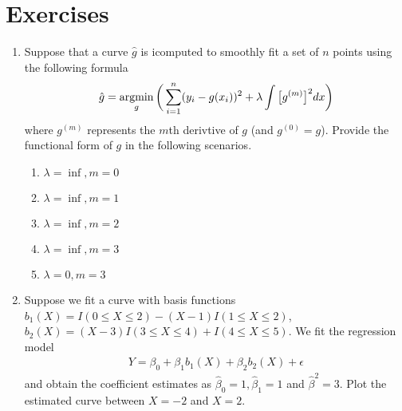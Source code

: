 \documentclass[../statistical_learning_notes.tex]{subfiles}
\begin{document}
    \section{Exercises}
    \begin{enumerate}
        \item Suppose that a curve $\hat{g}$ is icomputed to smoothly fit a set of $n$ points using the following formula
        \begin{align*}
            \hat{g} = \operatorname*{argmin}_{g} \bigg( \sum_{i=1}^{n} (y_{i} - g(x_{i}))^{2} + \lambda \int \big[ g^{(m)} \big]^{2} dx \bigg)
        \end{align*}
        where $g^{(m)}$ represents the $m$th derivtive of $g$ (and $g^{(0)}= g$). Provide the functional form of $g$ in the following scenarios.
        \begin{enumerate}
            \item $\lambda = \inf, m = 0$
            \item $\lambda = \inf, m = 1$
            \item $\lambda = \inf, m = 2$
            \item $\lambda = \inf, m = 3$
            \item $\lambda = 0, m = 3$
        \end{enumerate}


        \item Suppose we fit a curve with basis functions $b_{1}(X) = I(0 \leq X \leq 2) - (X-1)I(1 \leq X \leq 2)$, $b_{2}(X) = (X - 3)I(3 \leq X \leq 4) + I(4 \leq X \leq 5)$. We fit the regression model
        \begin{align*}
        Y = \beta_{0} + \beta_{1}b_{1}(X) + \beta_{2}b_{2}(X) + \epsilon
        \end{align*}
        and obtain the coefficient estimates as $\hat{\beta}_{0} = 1, \hat{\beta}_{1} = 1$ and $\hat{\beta}^{2} = 3$. Plot the estimated curve between $X = -2$ and $X = 2$.
        


\end{enumerate}
\end{document}
